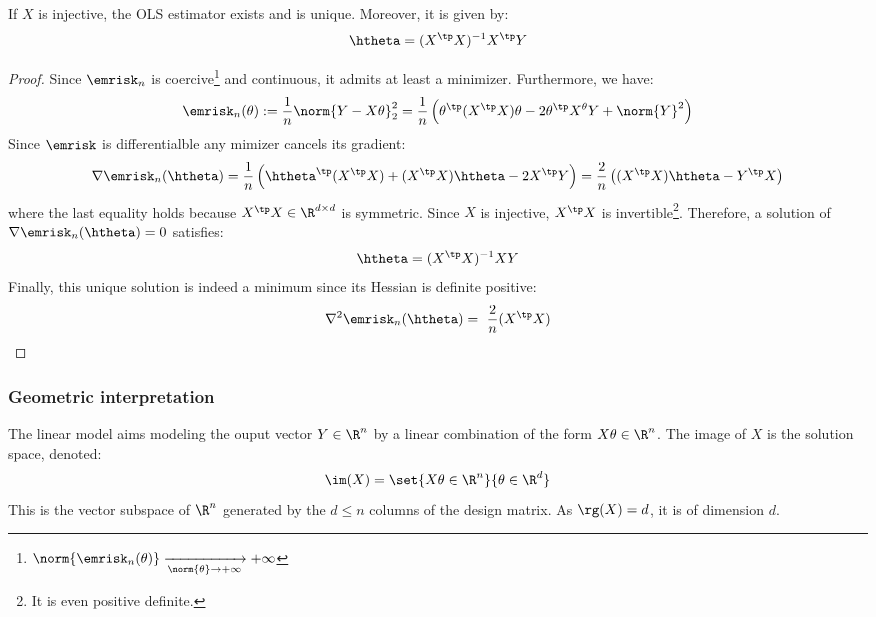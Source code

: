 \documentclass[toc, titlepaged]{../cs-classes/cs-classes}
\begin{document}
\begin{property}
    \label{prop:closed-form-OLS}
    If $X$ is injective, the OLS estimator exists and is unique. Moreover, it is given by:
    \begin{equation}
        \label{eq:closed-form-OLS}
        \htheta = (X^\tp X)^{-1}X^\tp Y
    \end{equation}
\end{property}

\begin{proof}
    Since $\emrisk_n$ is coercive\footnote{$\norm{\emrisk_n(\theta)} \xrightarrow[\norm{\theta}\to+\infty]{} +\infty$} and continuous, it admits at least a minimizer. Furthermore, we have:
    \begin{equation*}
        \emrisk_n(\theta) := \frac{1}{n}\norm{Y-X\theta}^2_2 = \frac{1}{n}\left(\theta^\tp(X^\tp X)\theta - 2\theta^\tp X^\theta Y+\norm{Y}^2\right)
    \end{equation*}
    Since $\emrisk$ is differentialble any mimizer cancels its gradient:
    \begin{equation*}
        \nabla\emrisk_n(\htheta) = \frac{1}{n}\left(\htheta^\tp(X^\tp X) + (X^\tp X)\htheta - 2X^\tp Y\right) = \frac{2}{n}\left((X^\tp X)\htheta - Y^\tp X\right)
    \end{equation*}
    where the last equality holds because $X^\tp X\in\R^{d\times d}$ is symmetric. Since $X$ is injective, $X^\tp X$ is invertible\footnote{It is even positive definite.}. Therefore, a solution of $\nabla\emrisk_n(\htheta)=0$ satisfies:
    \begin{equation*}
        \htheta = (X^\tp X)^{-1}XY
    \end{equation*}
    Finally, this unique solution is indeed a minimum since its Hessian is definite positive:
    \begin{equation*}
        \nabla^2\emrisk_n(\htheta) = \frac{2}{n}(X^\tp X)
    \end{equation*}
\end{proof}

\subsubsection{Geometric interpretation}
The linear model aims modeling the ouput vector $Y\in\R^n$ by a linear combination of the form $X\theta\in\R^n$. The image of $X$ is the solution space, denoted:
\begin{equation*}
    \im(X)=\set{X\theta\in\R^n}{\theta\in\R^d}
\end{equation*}
This is the vector subspace of $\R^n$ generated by the $d\leq n$ columns of the design matrix. As $\rg(X)=d$, it is of dimension $d$.
\end{document}

